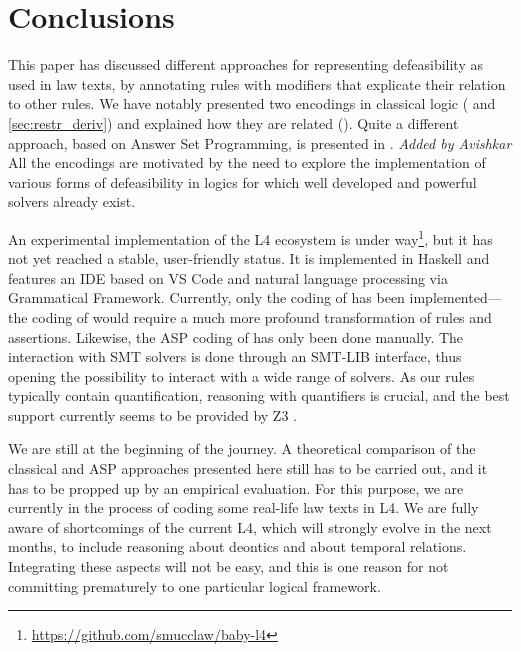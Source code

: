 \section{Conclusions}\label{sec:conclusions}

This paper has discussed different approaches for representing defeasibility
as used in law texts, by annotating rules with modifiers that explicate their
relation to other rules. We have notably presented two encodings in classical
logic ( and \ref{sec:restr_deriv}) and explained
how they are related (). Quite a different approach,
based on Answer Set Programming, is presented in
. \emph{Added by Avishkar} All the encodings are motivated by the need to explore the implementation of various forms of defeasibility in logics for which well developed and powerful solvers already exist.  

An experimental implementation of the L4 ecosystem is under
way\footnote{\url{https://github.com/smucclaw/baby-l4}}, but it has not yet
reached a stable, user-friendly status. It is implemented in Haskell and features
an IDE based on VS Code and natural language processing via Grammatical
Framework\cite{ranta_grammatical_2004}. Currently, only the coding of
 has been implemented---the coding of
 would require a much more profound transformation of
rules and assertions. Likewise, the ASP coding of 
has only been done manually. The interaction with SMT solvers is done through
an SMT-LIB \cite{BarFT_SMTLIB} interface, thus opening the possibility to
interact with a wide range of solvers. As our rules typically contain
quantification, reasoning with quantifiers is crucial, and the best support
currently seems to be provided by Z3 \cite{demoura_bjorner_z3_2008}.

We are still at the beginning of the journey. A theoretical comparison of the
classical and ASP approaches presented here still has to be carried out, and
it has to be propped up by an empirical evaluation. For this purpose, we are
currently in the process of coding some real-life law texts in L4. We are
fully aware of shortcomings of the current L4, which will strongly evolve in
the next months, to include reasoning about deontics and about temporal
relations. Integrating these aspects will not be easy, and this is one reason
for not committing prematurely to one particular logical framework.


